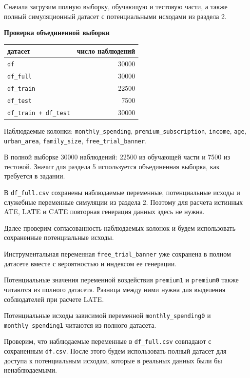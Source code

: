 \documentclass[11pt]{article}
\newcounter{none}
\begin{document}
    Сначала загрузим полную выборку, обучающую и тестовую части, а также
полный симуляционный датасет с потенциальными исходами из раздела 2.

    \textbf{Проверка объединенной выборки}

{\def\LTcaptype{none} %
\begin{longtable}[]{@{}lr@{}}
\toprule\noalign{}
датасет & число наблюдений \\
\midrule\noalign{}
\endhead
\bottomrule\noalign{}
\endlastfoot
\texttt{df} & 30000 \\
\texttt{df\_full} & 30000 \\
\texttt{df\_train} & 22500 \\
\texttt{df\_test} & 7500 \\
\texttt{df\_train\ +\ df\_test} & 30000 \\
\end{longtable}
}

Наблюдаемые колонки: \texttt{monthly\_spending},
\texttt{premium\_subscription}, \texttt{income}, \texttt{age},
\texttt{urban\_area}, \texttt{family\_size},
\texttt{free\_trial\_banner}.

    В полной выборке 30000 наблюдений: 22500 из обучающей части и 7500 из
тестовой. Значит для раздела 5 используется объединенная выборка, как
требуется в задании.

    В \texttt{df\_full.csv} сохранены наблюдаемые переменные, потенциальные
исходы и служебные переменные симуляции из раздела 2. Поэтому для
расчета истинных ATE, LATE и CATE повторная генерация данных здесь не
нужна.

Далее проверим согласованность наблюдаемых колонок и будем использовать
сохраненные потенциальные исходы.

    Инструментальная переменная \texttt{free\_trial\_banner} уже сохранена в
полном датасете вместе с вероятностью и индексом ее генерации.

    Потенциальные значения переменной воздействия \texttt{premium1} и
\texttt{premium0} также читаются из полного датасета. Разница между ними
нужна для выделения соблюдателей при расчете LATE.

    Потенциальные исходы зависимой переменной \texttt{monthly\_spending0} и
\texttt{monthly\_spending1} читаются из полного датасета.

    Проверим, что наблюдаемые переменные в \texttt{df\_full.csv} совпадают с
сохраненным \texttt{df.csv}. После этого будем использовать полный
датасет для доступа к потенциальным исходам, которые в реальных данных
были бы ненаблюдаемыми.
\end{document}
